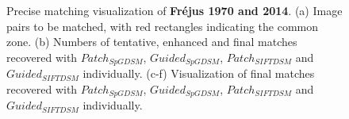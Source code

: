 \begin{figure}[htbp]
\begin{center}
{\begin{minipage}[t]{0.48\linewidth}
			\end{minipage}%
		}
		\caption{Precise matching visualization of \textbf{Fr{\'e}jus 1970 and 2014}. (a) Image pairs to be matched, with red rectangles indicating the common zone. (b) Numbers of tentative, enhanced and final matches recovered with $Patch_{SpGDSM}$, $Guided_{SpGDSM}$, $Patch_{SIFTDSM}$ and $Guided_{SIFTDSM}$ individually. (c-f) Visualization of final matches recovered with $Patch_{SpGDSM}$, $Guided_{SpGDSM}$, $Patch_{SIFTDSM}$ and $Guided_{SIFTDSM}$ individually.}
		\label{MatchVizFrejus1970-2014}
	\end{center}
\end{figure} 



